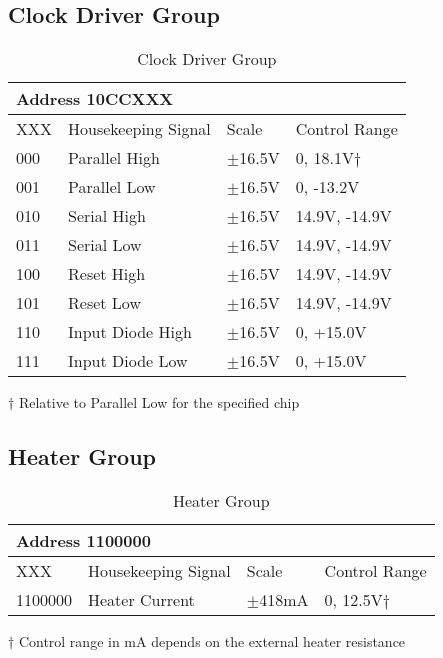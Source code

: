 \documentclass[12pt]{article}
\let\oldsubsection\subsection
\renewcommand{\subsection}{\FloatBarrier\oldsubsection}
\begin{document}
\subsection{Clock Driver Group}
\begin{table}[ht!]
\caption{Clock Driver Group}
\begin{tabular}{|l|l|l|l|}
\hline
\multicolumn{4}{|l|}{Address 10CCXXX} \\
\hline
XXX & Housekeeping Signal & Scale  & Control Range \\
\hline
000 & Parallel High & $\pm$16.5V & 0, 18.1V$\dagger$ \\
001 &Parallel Low &$\pm$16.5V & 0, -13.2V \\
010 & Serial High &$\pm$16.5V & 14.9V, -14.9V \\
011 & Serial Low &$\pm$16.5V & 14.9V, -14.9V \\
100 & Reset High &$\pm$16.5V & 14.9V, -14.9V \\
101 &Reset Low &$\pm$16.5V & 14.9V, -14.9V \\
110 &Input Diode High &$\pm$16.5V & 0, +15.0V \\
111 & Input Diode Low &$\pm$16.5V & 0, +15.0V \\
\hline
\end{tabular}
\vspace{5pt}

$\dagger$ Relative to Parallel Low for the specified chip
\label{clocktab}
\end{table}
\subsection{Heater Group}
\begin{table}[ht!]
\caption{Heater Group}
\begin{tabular}{|l|l|l|l|}
\hline
\multicolumn{4}{|l|}{Address 1100000} \\
\hline
XXX & Housekeeping Signal & Scale &  Control Range \\
\hline
1100000 & Heater Current & $\pm$418mA & 0, 12.5V$\dagger$ \\
\hline
\end{tabular}
\vspace{5pt}

$\dagger$ Control range in mA depends on the external heater resistance
\label{heattab}
\end{table}
\end{document}
